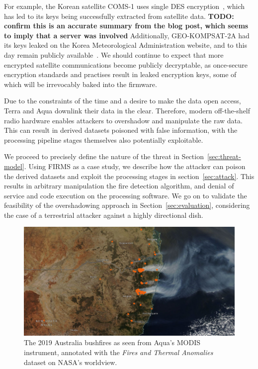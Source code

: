 For example, the Korean satellite COMS-1 uses single DES encryption~\cite{lrit-key-dec}, which has led to its keys being successfully extracted from satellite data. \textbf{TODO: confirm this is an accurate summary from the blog post, which seems to imply that a server was involved}
Additionally, GEO-KOMPSAT-2A had its keys leaked on the Korea Meteorological Administration website, and to this day remain publicly available~\cite{xrit-rx}.
We should continue to expect that more encrypted satellite communications become publicly decryptable, as once-secure encryption standards and practises result in leaked encryption keys, some of which will be irrevocably baked into the firmware.

Due to the constraints of the time and a desire to make the data open access, Terra and Aqua downlink their data in the clear.
Therefore, modern off-the-shelf radio hardware enables attackers to overshadow and manipulate the raw data.
This can result in derived datasets poisoned with false information, with the processing pipeline stages themselves also potentially exploitable.

We proceed to precisely define the nature of the threat in Section~\ref{sec:threat-model}.
Using FIRMS as a case study, we describe how the attacker can poison the derived datasets and exploit the processing stages in section~\ref{sec:attack}.
This results in arbitrary manipulation the fire detection algorithm, and denial of service and code execution on the processing software.
We go on to validate the feasibility of the overshadowing approach in Section~\ref{sec:evaluation}, considering the case of a terrestrial attacker against a highly directional dish.

\begin{figure}
    \centering
    \includegraphics[width=\columnwidth]{diagrams/bushfire.png}
    \caption{The 2019 Australia bushfires as seen from Aqua's MODIS instrument, annotated with the \textit{Fires and Thermal Anomalies} dataset on NASA's worldview.\protect\footnotemark}
    \label{fig:bushfire}
\end{figure}

